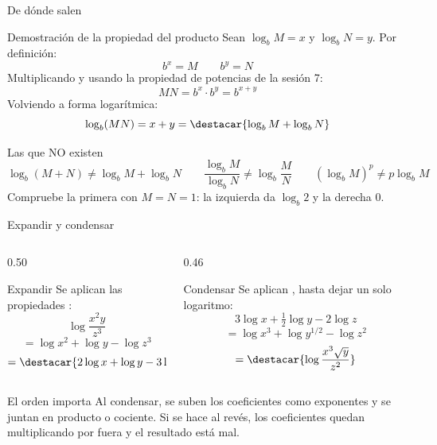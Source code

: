 \documentclass[aspectratio=169,10pt]{beamer}
\begin{document}
\begin{frame}{De dónde salen}
  \scriptsize
  \begin{block}{Demostración de la propiedad del producto}
    \tiny
    Sean $\log_{b}M = x$ y $\log_{b}N = y$. Por definición:
    \[ b^{x} = M \qquad b^{y} = N \]
    Multiplicando y usando la propiedad de potencias de la sesión 7:
    \[ MN = b^{x}\cdot b^{y} = b^{x+y} \]
    Volviendo a forma logarítmica:
    \[ \log_{b}(MN) = x+y = \destacar{\log_{b}M + \log_{b}N} \]
  \end{block}

  \vspace{0.05cm}
  \begin{alertblock}{Las que NO existen}
    \tiny
    \[ \log_{b}(M+N) \neq \log_{b}M + \log_{b}N \qquad
       \frac{\log_{b}M}{\log_{b}N} \neq \log_{b}\frac{M}{N} \qquad
       \left(\log_{b}M\right)^{p} \neq p\log_{b}M \]
    Compruebe la primera con $M=N=1$: la izquierda da $\log_b 2$ y la derecha
    $0$. 
  \end{alertblock}
\end{frame}

\begin{frame}{Expandir y condensar}
  \scriptsize
  \begin{columns}[T,onlytextwidth]
    \begin{column}{0.50\textwidth}
      \begin{block}{Expandir}
        \tiny
        Se aplican las propiedades :
        \[ \log\frac{x^{2}y}{z^{3}} \]
        \[ = \log x^{2} + \log y - \log z^{3} \]
        \[ = \destacar{2\log x + \log y - 3\log z} \]
      \end{block}
    \end{column}
    \begin{column}{0.46\textwidth}
      \begin{block}{Condensar}
        \tiny
        Se aplican , hasta dejar un solo logaritmo:
        \[ 3\log x + \tfrac{1}{2}\log y - 2\log z \]
        \[ = \log x^{3} + \log y^{1/2} - \log z^{2} \]
        \[ = \destacar{\log\frac{x^{3}\sqrt{y}}{z^{2}}} \]
      \end{block}
    \end{column}
  \end{columns}

  \vspace{0.1cm}
  \begin{alertblock}{El orden importa}
    \scriptsize
    Al condensar,  se suben los coeficientes como exponentes
    y  se juntan en producto o cociente. Si se hace al revés,
    los coeficientes quedan multiplicando por fuera y el resultado está mal.
  \end{alertblock}
\end{frame}
\end{document}

